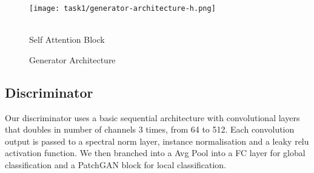\documentclass[twoside,english,notitlepage]{report}
\begin{document}
\begin{figure}[h]
    \centering
    \texttt{[image: task1/generator-architecture-h.png]}
    \caption{Generator Architecture}
    \begin{fullwidth}[innermargin=-2cm,width=\linewidth+4cm,nobreak]
        \begin{minipage}[t]{.5\textwidth}
            \centering
            \\Self Attention Block
        \end{minipage}
        \begin{minipage}[t]{.5\textwidth}
            \centering
        \end{minipage}
    \end{fullwidth}
\end{figure}

\subsection{Discriminator}\label{task1:discriminator}
Our discriminator uses a basic sequential architecture with convolutional layers that doubles in number of channels 3 times, from 64 to 512. Each convolution output is passed to a spectral norm layer, instance normalisation and a leaky relu activation function. We then branched into a Avg Pool into a FC layer for global classification and a PatchGAN block for local classification. \\
\end{document}
